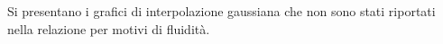 Si presentano i grafici di interpolazione gaussiana che non sono stati riportati nella relazione per motivi di fluidità.

 
 
 
 
 
 
 
 
